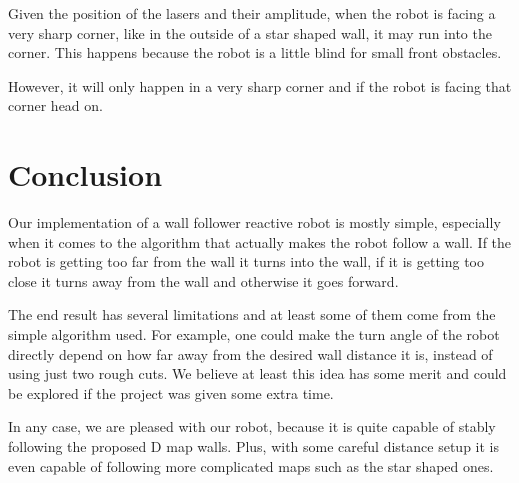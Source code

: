 \documentclass[10pt,journal,compsoc]{IEEEtran}
\begin{document}
Given the position of the lasers and their amplitude, when the robot is facing a very sharp corner, like in the outside of a star shaped wall, it may run into the corner. This happens because the robot is a little blind for small front obstacles.

However, it will only happen in a very sharp corner and if the robot is facing that corner head on.


\section{Conclusion}

Our implementation of a wall follower reactive robot is mostly simple, especially when it comes to the algorithm that actually makes the robot follow a wall. If the robot is getting too far from the wall it turns into the wall, if it is getting too close it turns away from the wall and otherwise it goes forward.

The end result has several limitations and at least some of them come from the simple algorithm used. For example, one could make the turn angle of the robot directly depend on how far away from the desired wall distance it is, instead of using just two rough cuts. We believe at least this idea has some merit and could be explored if the project was given some extra time.

In any case, we are pleased with our robot, because it is quite capable of stably following the proposed D map walls. Plus, with some careful distance setup it is even capable of following more complicated maps such as the star shaped ones.

\ifCLASSOPTIONcaptionsoff
\newpage
\fi



\end{document}
